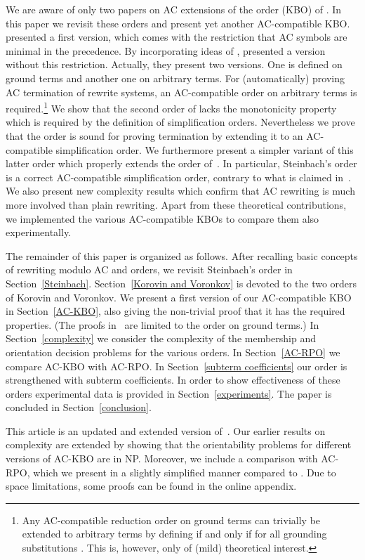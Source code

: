 \documentclass{tlp}
\begin{document}
We are aware of only two papers on AC extensions of the order (KBO) of 
.
In this paper we revisit these orders and
present yet another AC-compatible KBO.
 presented
a first version, which comes with the restriction that AC symbols are
minimal in the precedence. By incorporating ideas of \cite{R02},
 presented a version without this restriction.
Actually, they present two versions. One is defined on ground terms
and another one on arbitrary terms. For (automatically) proving
AC termination of rewrite systems,
an AC-compatible order on arbitrary terms is required.\footnote{Any AC-compatible reduction order  on ground
terms can trivially be extended to
arbitrary terms by defining  if and only if
 for all grounding substitutions .
This is, however, only of (mild) theoretical interest.}
We show that the second order of  lacks the
monotonicity property which is required by the definition of
simplification orders.
Nevertheless we prove that the order is sound for
proving termination by extending it to an AC-compatible
simplification order.
We furthermore present a simpler variant of this latter order which
properly extends the order of~.
In particular, Steinbach's order is a correct
AC-compatible simplification order, contrary to what is claimed
in~\cite{KV03b}.
We also present new complexity results which confirm that
AC rewriting is much more involved than plain rewriting.
Apart from these theoretical contributions, we implemented the
various AC-compatible KBOs to compare them also experimentally.

The remainder of this paper is organized as follows. After
recalling basic concepts of rewriting modulo AC and orders,
we revisit Steinbach's order in Section~\ref{Steinbach}.
Section~\ref{Korovin and Voronkov} is devoted to the two orders of
Korovin and Voronkov. We present a first version of our AC-compatible KBO
in Section~\ref{AC-KBO}, 
also giving the non-trivial proof that
it has the required properties. (The proofs in~\cite{KV03b} are limited
to the order on ground terms.)
In Section~\ref{complexity} we consider the complexity of the
membership and orientation decision problems for the various orders.
In Section~\ref{AC-RPO} we compare AC-KBO with AC-RPO.
In Section~\ref{subterm coefficients} our order is strengthened
with subterm coefficients.
In order to show effectiveness of these orders
experimental data is provided in Section~\ref{experiments}.
The paper is concluded in Section~\ref{conclusion}.

This article is an updated and extended version of~\cite{YWHM14}.
Our earlier results on complexity are extended by showing that
the orientability problems for different versions of AC-KBO
are in NP. Moreover, we include a comparison with AC-RPO, which
we present in a slightly simplified manner compared to \cite{R02}.
Due to space limitations, some proofs can be found in the online appendix.
\end{document}
